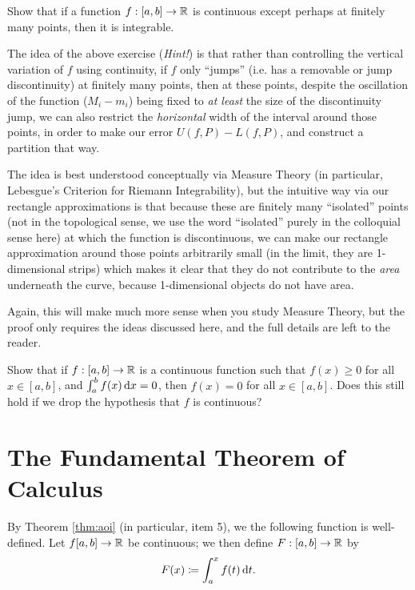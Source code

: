 \documentclass[../analysis1.tex]{subfiles}
\begin{document}
\begin{exercise*}
    Show that if a function $f:[a,b]\to\mathbb{R}$ is continuous except perhaps at finitely many points, then it is integrable.
\end{exercise*}

The idea of the above exercise (\textit{Hint!}) is that rather than controlling the vertical variation of $f$ using continuity, if $f$ only ``jumps'' (i.e. has a removable or jump discontinuity) at finitely many points, then at these points, despite the oscillation of the function ($M_i-m_i$) being fixed to \textit{at least} the size of the discontinuity jump, we can also restrict the \textit{horizontal} width of the interval around those points, in order to make our error $U(f,P)-L(f,P)$, and construct a partition that way.

The idea is best understood conceptually via Measure Theory (in particular, Lebesgue's Criterion for Riemann Integrability), but the intuitive way via our rectangle approximations is that because these are finitely many ``isolated'' points (not in the topological sense, we use the word ``isolated'' purely in the colloquial sense here) at which the function is discontinuous, we can make our rectangle approximation around those points arbitrarily small (in the limit, they are 1-dimensional strips) which makes it clear that they do not contribute to the \textit{area} underneath the curve, because 1-dimensional objects do not have area.

Again, this will make much more sense when you study Measure Theory, but the proof only requires the ideas discussed here, and the full details are left to the reader.


\begin{exercise*}
    Show that if $f:[a,b]\to\mathbb{R}$ is a continuous function such that $f(x) \ge 0$ for all $x\in [a,b]$, and $\int_a^b f(x) \d{x} = 0$, then $f(x) = 0$ for all $x \in [a,b]$. Does this still hold if we drop the hypothesis that $f$ is continuous?
\end{exercise*}

\section{The Fundamental Theorem of Calculus}
By Theorem \ref{thm:aoi} (in particular, item 5), we the following function is well-defined. Let $f[a,b]\to\mathbb{R}$ be continuous; we then define $F:[a,b]\to\mathbb{R}$ by \[
            F(x) \coloneqq \int_a^x f(t) \d{t}.
        \]
\end{document}
